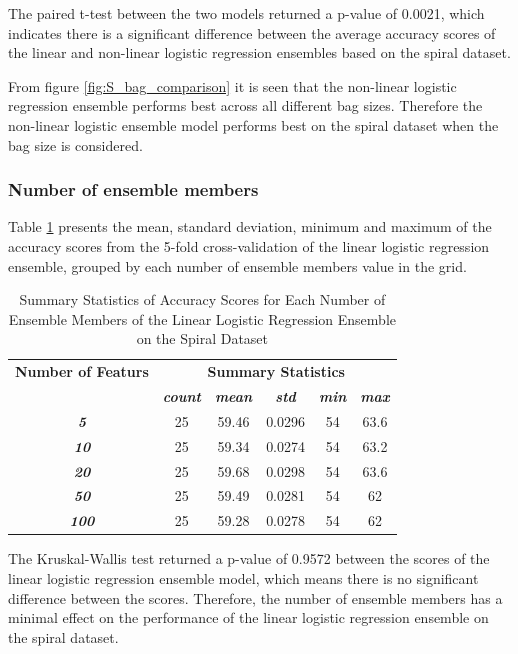 \documentclass[10pt, conference]{IEEEtran}
\begin{document}
The paired t-test between the two models returned a p-value of 0.0021, which indicates there is a significant difference
between the average accuracy scores of the linear and non-linear logistic regression ensembles based on the spiral dataset.

From figure \ref{fig:S_bag_comparison} it is seen that the non-linear logistic regression ensemble performs best across
all different bag sizes. Therefore the non-linear logistic ensemble model performs best on the spiral dataset when the
bag size is considered.

\subsubsection{Number of ensemble members}

Table \ref{table: S_member_linear_performance_metrics} presents the mean, standard deviation, minimum and maximum of the
accuracy scores from the 5-fold cross-validation of the linear logistic regression ensemble, grouped by each number of ensemble members
value in the grid.
\begin{table}[H]
    \caption{Summary Statistics of Accuracy Scores for Each Number of Ensemble Members of the Linear Logistic Regression Ensemble on the Spiral Dataset}
    \begin{center}
        \begin{tabular}{|c||c|c|c|c|c|}
            \hline
            \textbf{Number of Featurs}&\multicolumn{5}{|c|}{\textbf{Summary Statistics}} \\
            \cline{2-6}
                       &\textbf{\textit{count}} & \textbf{\textit{mean}} & \textbf{\textit{std}} & \textbf{\textit{min}} & \textbf{\textit{max}}\\
            \hline
            \textbf{\textit{5}}   & 25 & 59.46 & 0.0296 & 54 & 63.6 \\
            \textbf{\textit{10}}  & 25 & 59.34 & 0.0274 & 54 & 63.2 \\
            \textbf{\textit{20}}  & 25 & 59.68 & 0.0298 & 54 & 63.6 \\
            \textbf{\textit{50}}  & 25 & 59.49 & 0.0281 & 54 & 62 \\
            \textbf{\textit{100}} & 25 & 59.28 & 0.0278 & 54 & 62 \\
            \hline
        \end{tabular}
    \end{center}
    \label{table: S_member_linear_performance_metrics}
\end{table}
The Kruskal-Wallis test returned a p-value of 0.9572 between the scores of the linear logistic regression ensemble model,
which means there is no significant difference between the scores. Therefore, the number of ensemble members
has a minimal effect on the performance of the linear logistic regression ensemble on the spiral dataset.
\end{document}
